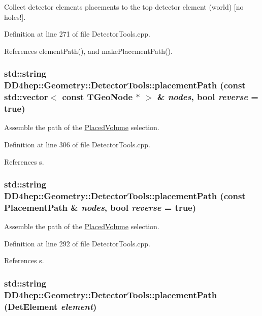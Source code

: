 Collect detector elements placements to the top detector element (world) \mbox{[}no holes!\mbox{]}. 

Definition at line 271 of file DetectorTools.cpp.

References elementPath(), and makePlacementPath().\hypertarget{namespace_d_d4hep_1_1_geometry_1_1_detector_tools_ad25502414dd3799806729e2d72f9a34a}{
\subsubsection[{placementPath}]{\setlength{\rightskip}{0pt plus 5cm}std::string DD4hep::Geometry::DetectorTools::placementPath (const std::vector$<$ const TGeoNode $\ast$ $>$ \& {\em nodes}, \/  bool {\em reverse} = {\ttfamily true})}}
\label{namespace_d_d4hep_1_1_geometry_1_1_detector_tools_ad25502414dd3799806729e2d72f9a34a}


Assemble the path of the \hyperlink{class_d_d4hep_1_1_geometry_1_1_placed_volume}{PlacedVolume} selection. 

Definition at line 306 of file DetectorTools.cpp.

References s.\hypertarget{namespace_d_d4hep_1_1_geometry_1_1_detector_tools_a792502fe2b1afaa030b9697151824452}{
\subsubsection[{placementPath}]{\setlength{\rightskip}{0pt plus 5cm}std::string DD4hep::Geometry::DetectorTools::placementPath (const {\bf PlacementPath} \& {\em nodes}, \/  bool {\em reverse} = {\ttfamily true})}}
\label{namespace_d_d4hep_1_1_geometry_1_1_detector_tools_a792502fe2b1afaa030b9697151824452}


Assemble the path of the \hyperlink{class_d_d4hep_1_1_geometry_1_1_placed_volume}{PlacedVolume} selection. 

Definition at line 292 of file DetectorTools.cpp.

References s.\hypertarget{namespace_d_d4hep_1_1_geometry_1_1_detector_tools_a1ca0d88ab941b6dde4776c6b3b893fb6}{
\subsubsection[{placementPath}]{\setlength{\rightskip}{0pt plus 5cm}std::string DD4hep::Geometry::DetectorTools::placementPath ({\bf DetElement} {\em element})}}
\label{namespace_d_d4hep_1_1_geometry_1_1_detector_tools_a1ca0d88ab941b6dde4776c6b3b893fb6}


